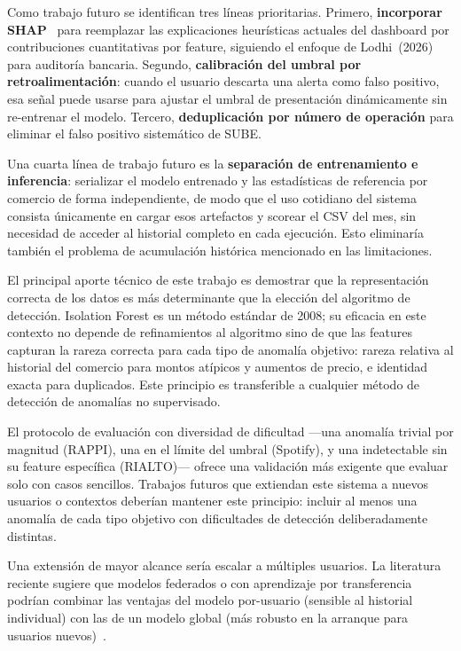 \documentclass[conference]{IEEEtran}
\begin{document}
Como trabajo futuro se identifican tres l\'ineas prioritarias. Primero,
\textbf{incorporar SHAP}~\cite{lodhi2026explainable} para reemplazar las
explicaciones heur\'isticas actuales del dashboard por contribuciones cuantitativas
por feature, siguiendo el enfoque de Lodhi~(2026) para auditor\'ia bancaria.
Segundo, \textbf{calibraci\'on del umbral por retroalimentaci\'on}: cuando el usuario
descarta una alerta como falso positivo, esa se\~nal puede usarse para ajustar el
umbral de presentaci\'on din\'amicamente sin re-entrenar el modelo. Tercero,
\textbf{deduplicaci\'on por n\'umero de operaci\'on} para eliminar el falso positivo
sistem\'atico de SUBE.

Una cuarta l\'inea de trabajo futuro es la \textbf{separaci\'on de entrenamiento
e inferencia}: serializar el modelo entrenado y las estad\'isticas de referencia
por comercio de forma independiente, de modo que el uso cotidiano del sistema
consista \'unicamente en cargar esos artefactos y scorear el CSV del mes, sin
necesidad de acceder al historial completo en cada ejecuci\'on. Esto eliminar\'ia
tambi\'en el problema de acumulaci\'on hist\'orica mencionado en las limitaciones.

El principal aporte t\'ecnico de este trabajo es demostrar que la representaci\'on
correcta de los datos es m\'as determinante que la elecci\'on del algoritmo de
detecci\'on. Isolation Forest es un m\'etodo est\'andar de 2008; su eficacia en
este contexto no depende de refinamientos al algoritmo sino de que las features
capturan la rareza correcta para cada tipo de anomal\'ia objetivo: rareza relativa
al historial del comercio para montos at\'ipicos y aumentos de precio, e identidad
exacta para duplicados. Este principio es transferible a cualquier m\'etodo de
detecci\'on de anomal\'ias no supervisado.

El protocolo de evaluaci\'on con diversidad de dificultad ---una anomal\'ia trivial
por magnitud (RAPPI), una en el l\'imite del umbral (Spotify), y una indetectable
sin su feature espec\'ifica (RIALTO)--- ofrece una validaci\'on m\'as exigente
que evaluar solo con casos sencillos. Trabajos futuros que extiendan este sistema
a nuevos usuarios o contextos deber\'ian mantener este principio: incluir al menos
una anomal\'ia de cada tipo objetivo con dificultades de detecci\'on
deliberadamente distintas.

Una extensi\'on de mayor alcance ser\'ia escalar a m\'ultiples usuarios. La
literatura reciente sugiere que modelos federados o con aprendizaje por transferencia
podr\'ian combinar las ventajas del modelo por-usuario (sensible al historial
individual) con las de un modelo global (m\'as robusto en la arranque para usuarios
nuevos)~\cite{feng2026machine, gamal2026enhancing, hassan2026transfer}.



\end{document}

